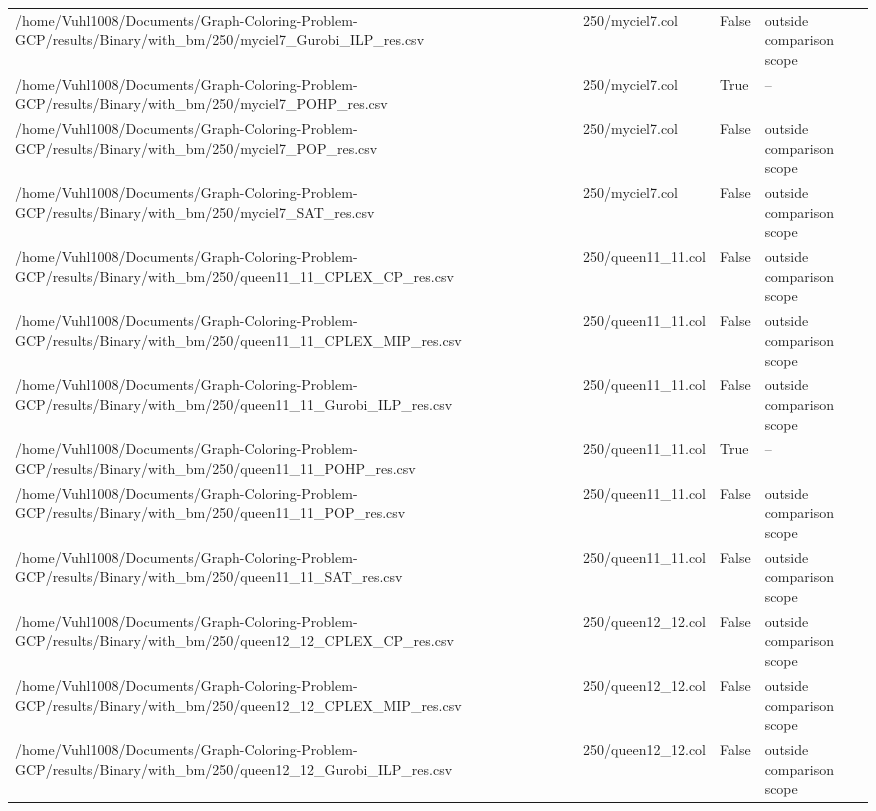 \begin{table}[htbp]
\begin{tabular}{llll}
/home/Vuhl1008/Documents/Graph-Coloring-Problem-GCP/results/Binary/with\_bm/250/myciel7\_Gurobi\_ILP\_res.csv & 250/myciel7.col & False & outside comparison scope \\
/home/Vuhl1008/Documents/Graph-Coloring-Problem-GCP/results/Binary/with\_bm/250/myciel7\_POHP\_res.csv & 250/myciel7.col & True & -- \\
/home/Vuhl1008/Documents/Graph-Coloring-Problem-GCP/results/Binary/with\_bm/250/myciel7\_POP\_res.csv & 250/myciel7.col & False & outside comparison scope \\
/home/Vuhl1008/Documents/Graph-Coloring-Problem-GCP/results/Binary/with\_bm/250/myciel7\_SAT\_res.csv & 250/myciel7.col & False & outside comparison scope \\
/home/Vuhl1008/Documents/Graph-Coloring-Problem-GCP/results/Binary/with\_bm/250/queen11\_11\_CPLEX\_CP\_res.csv & 250/queen11\_11.col & False & outside comparison scope \\
/home/Vuhl1008/Documents/Graph-Coloring-Problem-GCP/results/Binary/with\_bm/250/queen11\_11\_CPLEX\_MIP\_res.csv & 250/queen11\_11.col & False & outside comparison scope \\
/home/Vuhl1008/Documents/Graph-Coloring-Problem-GCP/results/Binary/with\_bm/250/queen11\_11\_Gurobi\_ILP\_res.csv & 250/queen11\_11.col & False & outside comparison scope \\
/home/Vuhl1008/Documents/Graph-Coloring-Problem-GCP/results/Binary/with\_bm/250/queen11\_11\_POHP\_res.csv & 250/queen11\_11.col & True & -- \\
/home/Vuhl1008/Documents/Graph-Coloring-Problem-GCP/results/Binary/with\_bm/250/queen11\_11\_POP\_res.csv & 250/queen11\_11.col & False & outside comparison scope \\
/home/Vuhl1008/Documents/Graph-Coloring-Problem-GCP/results/Binary/with\_bm/250/queen11\_11\_SAT\_res.csv & 250/queen11\_11.col & False & outside comparison scope \\
/home/Vuhl1008/Documents/Graph-Coloring-Problem-GCP/results/Binary/with\_bm/250/queen12\_12\_CPLEX\_CP\_res.csv & 250/queen12\_12.col & False & outside comparison scope \\
/home/Vuhl1008/Documents/Graph-Coloring-Problem-GCP/results/Binary/with\_bm/250/queen12\_12\_CPLEX\_MIP\_res.csv & 250/queen12\_12.col & False & outside comparison scope \\
/home/Vuhl1008/Documents/Graph-Coloring-Problem-GCP/results/Binary/with\_bm/250/queen12\_12\_Gurobi\_ILP\_res.csv & 250/queen12\_12.col & False & outside comparison scope \\

\end{tabular}
\end{table}
